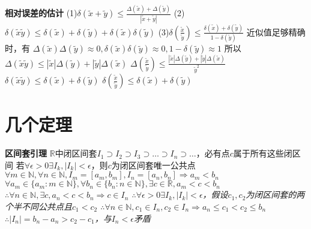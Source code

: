 \documentclass[11pt]{article}
\begin{document}
\textbf{相对误差的估计} \newline
(1)$\delta(\tilde{x}+\tilde{y}) \le \frac{\Delta(\tilde{x})+\Delta(\tilde{y})}{|\tilde{x}+\tilde{y}|}$ \newline
(2)$\delta(\tilde{x}\tilde{y}) \le \delta(\tilde{x})+\delta(\tilde{y})+\delta(\tilde{x})\delta(\tilde{y})$ \newline
(3)$\delta(\frac{\tilde{x}}{\tilde{y}}) \le \frac{\delta(\tilde{x})+\delta(\tilde{y})}{1-\delta(\tilde{y})}$ \newline
近似值足够精确时，有 \newline
$\Delta(\tilde{x})\Delta(\tilde{y})\approx 0, \delta(\tilde{x})\delta(\tilde{y})\approx 0, 1-\delta(\tilde{y})\approx 1$ \newline
所以 \newline
$\Delta(\tilde{x}\tilde{y}) \le |\tilde{x}|\Delta(\tilde{y})+|\tilde{y}|\Delta(\tilde{x})$ \newline
$\Delta(\frac{\tilde{x}}{\tilde{y}}) \le \frac{|\tilde{x}|\Delta(\tilde{y})+ |\tilde{y}|\Delta(\tilde{x})}{\tilde{y}^2}$ \newline
$\delta(\tilde{x}\tilde{y}) \le \delta(\tilde{x})+\delta(\tilde{y})$ \newline
$\delta(\frac{\tilde{x}}{\tilde{y}}) \le \delta(\tilde{x})+\delta(\tilde{y})$ \newline

\section{几个定理}
\textbf{区间套引理} \newline
$\mathbb{R}$中闭区间套$I_1\supset I_2\supset I_3\supset\dots\supset I_n\supset\dots$，必有点$c$属于所有这些闭区间 \newline
若$\forall\epsilon>0 \exists I_k, |I_k|<\epsilon$，则$c$为闭区间套唯一公共点 \newline
\textit{$\forall m \in\mathbb{N}, \forall n\in\mathbb{N}, I_m=[a_m,b_m],I_n=[a_n,b_n] \Rightarrow a_m<b_n$ \newline
$\forall a_m\in\{a_m:m\in\mathbb{N}\}, \forall b_n\in\{b_n:n\in\mathbb{N}\}, \exists c\in\mathbb{R}, a_m<c<b_n$ \newline
$\therefore \forall n\in\mathbb{N}, \exists c, a_n<c<b_n \Rightarrow c\in I_n$ \newline
$\therefore \forall\epsilon>0 \exists I_k, |I_k|<\epsilon$，假设$c_1,c_2$为闭区间套的两个半不同公共点且$c_1<c_2$ \newline
$\therefore \forall n\in\mathbb{N}, c_1\in I_n, c_2\in I_n \Rightarrow a_n\le c_1<c_2\le b_n$ \newline
$\therefore |I_n|=b_n-a_n>c_2-c_1$，与$I_n<\epsilon$矛盾} \newline
\end{document}
